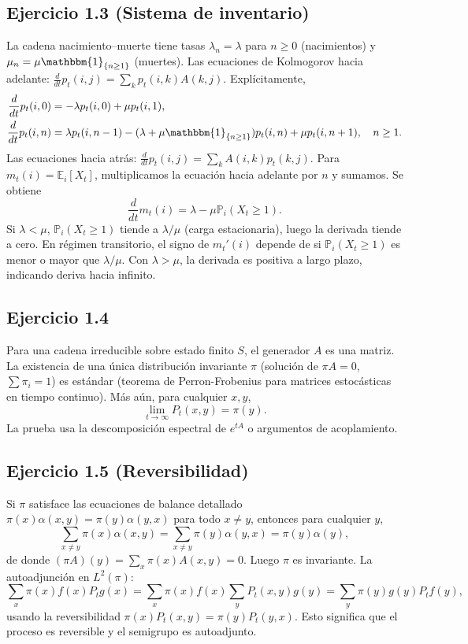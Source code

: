 \documentclass[letterpaper, 12pt]{article}
\newcommand{\E}{\mathbb{E}}
\renewcommand{\P}{\mathbb{P}}
\newcommand{\1}{\mathbbm{1}}
\begin{document}
    \subsection{Ejercicio 1.3 (Sistema de inventario)}
    La cadena nacimiento--muerte tiene tasas $\lambda_n=\lambda$ para $n\ge0$ (nacimientos) y $\mu_n=\mu\1_{\{n\ge1\}}$ (muertes). Las ecuaciones de Kolmogorov hacia adelante: $\frac{d}{dt}p_t(i,j)=\sum_k p_t(i,k)A(k,j)$. Expl\'icitamente,
    \[
    \begin{aligned}
    \frac{d}{dt}p_t(i,0)&=-\lambda p_t(i,0)+\mu p_t(i,1),\\
    \frac{d}{dt}p_t(i,n)&=\lambda p_t(i,n-1)-(\lambda+\mu\1_{\{n\ge1\}})p_t(i,n)+\mu p_t(i,n+1),\quad n\ge1.
    \end{aligned}
    \]
    Las ecuaciones hacia atr\'as: $\frac{d}{dt}p_t(i,j)=\sum_k A(i,k)p_t(k,j)$.
    Para $m_t(i)=\E_i[X_t]$, multiplicamos la ecuaci\'on hacia adelante por $n$ y sumamos. Se obtiene
    \[
    \frac{d}{dt}m_t(i)=\lambda-\mu\P_i(X_t\ge1).
    \]
    Si $\lambda<\mu$, $\P_i(X_t\ge1)$ tiende a $\lambda/\mu$ (carga estacionaria), luego la derivada tiende a cero. En r\'egimen transitorio, el signo de $m_t'(i)$ depende de si $\P_i(X_t\ge1)$ es menor o mayor que $\lambda/\mu$. Con $\lambda>\mu$, la derivada es positiva a largo plazo, indicando deriva hacia infinito.

    \subsection{Ejercicio 1.4}
    Para una cadena irreducible sobre estado finito $S$, el generador $A$ es una matriz. La existencia de una \'unica distribuci\'on invariante $\pi$ (soluci\'on de $\pi A=0$, $\sum\pi_i=1$) es est\'andar (teorema de Perron-Frobenius para matrices estoc\'asticas en tiempo continuo). M\'as a\'un, para cualquier $x,y$,
    \[
    \lim_{t\to\infty}P_t(x,y)=\pi(y).
    \]
    La prueba usa la descomposici\'on espectral de $e^{tA}$ o argumentos de acoplamiento.

    \subsection{Ejercicio 1.5 (Reversibilidad)}
    Si $\pi$ satisface las ecuaciones de balance detallado $\pi(x)\alpha(x,y)=\pi(y)\alpha(y,x)$ para todo $x\neq y$, entonces para cualquier $y$,
    \[
    \sum_{x\neq y}\pi(x)\alpha(x,y)=\sum_{x\neq y}\pi(y)\alpha(y,x)=\pi(y)\alpha(y),
    \]
    de donde $(\pi A)(y)=\sum_x\pi(x)A(x,y)=0$. Luego $\pi$ es invariante. La autoadjunci\'on en $L^2(\pi)$:
    \[
    \sum_x\pi(x)f(x)P_tg(x)=\sum_x\pi(x)f(x)\sum_y P_t(x,y)g(y)=\sum_y\pi(y)g(y)P_tf(y),
    \]
    usando la reversibilidad $\pi(x)P_t(x,y)=\pi(y)P_t(y,x)$. Esto significa que el proceso es reversible y el semigrupo es autoadjunto.
\end{document}
